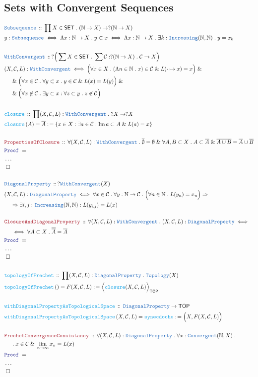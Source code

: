 \documentclass[12pt]{scrartcl}
\newcommand{\TYPE}[1]{\textcolor{NavyBlue}{\mathtt{#1}}}
\newcommand{\FUNC}[1]{\textcolor{Cerulean}{\mathtt{#1}}}
\newcommand{\LOGIC}[1]{\textcolor{Blue}{\mathtt{#1}}}
\newcommand{\THM}[1]{\textcolor{Maroon}{\mathtt{#1}}}
\renewcommand{\.}{\; . \;}
\newcommand{\de}{: \kern 0.1pc =}
\newcommand{\Act}[1]{\left( #1 \right)}
\newcommand{\Theorem}[2]{& \THM{#1} \, :: \, #2 \\ & \Proof = \\ }
\newcommand{\DeclareType}[2]{& \TYPE{#1} \, :: \, #2 \\}
\newcommand{\DefineType}[3]{& #1 : \TYPE{#2} \iff #3 \\}
\newcommand{\DefineNamedType}[4]{& #1 : \TYPE{#2} \iff #3 \iff #4 \\}
\newcommand{\DeclareFunc}[2]{& \FUNC{#1} \, :: \, #2 \\}
\newcommand{\DefineNamedFunc}[4]{&  \FUNC{#1}\Act{#2} = #3 \de #4 \\}
\newcommand{\NewLine}{\\ & \kern 1pc}
\newcommand{\Page}[1]{ \begin{align*} #1 \end{align*}   }
\newcommand{\NoProof}{ & \ldots \\ \EndProof}
\renewcommand{\And}{\; \& \;}
\newcommand{\Imply}{\Rightarrow}
\newcommand{\Nat}{\mathbb{N} }
\DeclareMathOperator*{\im}{Im}
\newcommand{\QED}{\; \square}
\newcommand{\EndProof}{& \QED \\}
\newcommand{\Proof}{\LOGIC{Proof} \; }
\newcommand{\C}{\mathcal{C}}
\newcommand{\SET}{\mathsf{SET}}
\newcommand{\TOP}{\mathsf{TOP}}
\begin{document}
\subsection{Sets with Convergent Sequences}
\Page{
	\DeclareType{Subsequence}{\prod X \in \SET \. (\Nat \to X) \to ?(\Nat \to X)}
	\DefineNamedType{y}{Subsequence}{\Lambda x : \Nat \to X \. y \subset x}
	{
		\Lambda x : \Nat \to X \. \exists k : \TYPE{Increasing}(\Nat,\Nat) \. y = x_k
	}
	\\
	\DeclareType{WithConvergent}
	{
		?\Big( \sum X \in \SET \. \sum \C : ?(\Nat \to X) \. \C \to X  \Big)
	}
	\DefineType{(X,\C,L)}
	{
		\TYPE{WithConvergent}
	}
	{
		\Big( \forall x \in X \. 
		(\Lambda n \in \Nat \. x) \in \C \And  L(\cdot \mapsto x) = x \Big) \And \NewLine \And
		\Big( 
			\forall x \in \C \. \forall y \subset x \. y \in \C \And L(x) = L(y)
		\Big) \And \NewLine \And
		\Big(
			\forall x \not \in \C \. \exists y \subset x : \forall z \subset y \. z \not \in \C
		\Big)
	}
	\\
	\DeclareFunc{closure}{\prod (X,\C,L) : \TYPE{WithConvergent} \. ?X \to ?X}
	\DefineNamedFunc{closure}{A}{\overline{A}}{\{ x \in X : \exists a \in \C : \im a \subset A \And L(a) = x \}}
	\\
	\Theorem{PropertiesOfClosure}
	{
		\forall (X,\C,L) : \TYPE{WithConvergent} \.
		\overline{\emptyset} = \emptyset \And
		\forall A,B \subset X \. 
		A \subset \overline{A} \And
		\overline{A \cup B} = \overline{A} \cup \overline{B}
	}
	\NoProof
	\\
	\DeclareType{DiagonalProperty}
	{
		? \TYPE{WithConvergent}(X)
	}
	\DefineType{(X,\C,L)}{DiagonalProperty}
	{
		\forall x \in \C \. 
		\forall y : \Nat \to \C \.
		\Big( \forall n \in \Nat \. L(y_n) = x_n  \Big) \Imply \NewLine \Imply 
		\exists i,j : \TYPE{Increasing}(\Nat,\Nat) : 
		L( y_{i,j} ) = L(x)
	}
	\\
	\Theorem{ClosureAndDiagonalProperty}
	{
		\forall (X,\C,L) : \TYPE{WithConvergent} \. 
		(X,\C,L) : \TYPE{DiagonalProperty} \iff \NewLine \iff
		\forall A \subset X \. \overline{\overline{A}} = \overline{A}
	}
	\NoProof
	\\
	\DeclareFunc{topologyOfFrechet}
	{
		\prod (X,\C,L) : \TYPE{DiagonalProperty} \.
		\TYPE{Topology}(X)
	}
	\DefineNamedFunc{topologyOfFrechet}{}{F(X,\C,L)}{ \Big\langle \FUNC{closure}(X,\C,L)  \Big\rangle_\TOP}
	\\
	\DeclareFunc{withDiagonalPropertyAsTopologicalSpace}{ \TYPE{DiagonalProperty} \to \TOP  }
	\DefineNamedFunc{withDiagonalPropertyAsTopologicalSpace}{X,\C,L}
	{ \FUNC{synecdoche} }{ \Big( X, F(X,\C,L) \Big)  }
	\\
	\Theorem{FrechetConvergenceConsistancy}
	{
		\forall (X,\C,L) : \TYPE{DiagonalProperty} \. 
		\forall x : \TYPE{Convergent}(\Nat,X) \. \NewLine \.  
		x \in \C \And \lim_{n \to \infty} x_n = L(x)
	}
	\NoProof
}
\newpage
\end{document}
